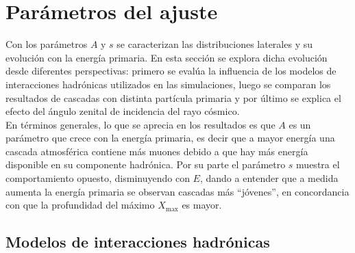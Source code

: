 		
\section{Par\'ametros del ajuste}
Con los par\'ametros $A$ y $s$ se caracterizan las distribuciones laterales y su evoluci\'on con la energ\'ia primaria. En esta secci\'on se explora dicha evoluci\'on desde diferentes perspectivas: primero se eval\'ua la influencia de los modelos de interacciones hadr\'onicas utilizados en las simulaciones, luego se comparan los resultados de cascadas con distinta part\'icula primaria y por \'ultimo se explica el efecto del \'angulo zenital de incidencia del rayo c\'osmico. \\

En t\'erminos generales, lo que se aprecia en los resultados es que $A$ es un par\'ametro que crece con la energ\'ia primaria, es decir que a mayor energ\'ia una cascada atmosf\'erica contiene m\'as muones debido a que hay m\'as energ\'ia disponible en su componente hadr\'onica. Por su parte el par\'ametro $s$ muestra el comportamiento opuesto, disminuyendo con $E$, dando a entender que a medida aumenta la energ\'ia primaria se observan cascadas m\'as ``j\'ovenes'', en concordancia con que la profundidad del m\'aximo $X_{\text{max}}$ es mayor.

	\subsection{Modelos de interacciones hadr\'onicas}
	
